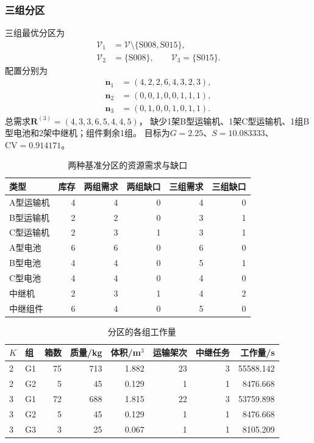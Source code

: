 \subsubsection{三组分区}
三组最优分区为
\begin{align}
\mathcal V_1&=\mathcal V\setminus\{\mathrm{S008,S015}\},\\
\mathcal V_2&=\{\mathrm{S008}\},\qquad \mathcal V_3=\{\mathrm{S015}\}.
\end{align}
配置分别为
\begin{align}
\boldsymbol n_1&=(4,2,2,6,4,3,2,3),\\
\boldsymbol n_2&=(0,0,1,0,0,1,1,1),\\
\boldsymbol n_3&=(0,1,0,0,1,0,1,1).
\end{align}
总需求$\boldsymbol R^{(3)}=(4,3,3,6,5,4,4,5)$，
缺少1架B型运输机、1架C型运输机、1组B型电池和2架中继机；组件剩余1组。
目标为$G=2.25$、$S=10.083333$、$\mathrm{CV}=0.914171$。
\begin{table}[htbp]
\centering
\small
\caption{两种基准分区的资源需求与缺口}
\label{tab:q4_resources}
\begin{tabular}{lrrrrr}
\toprule
类型 & 库存 & 两组需求 & 两组缺口 & 三组需求 & 三组缺口 \\
\midrule
A型运输机 & 4 & 4 & 0 & 4 & 0 \\
B型运输机 & 2 & 2 & 0 & 3 & 1 \\
C型运输机 & 2 & 3 & 1 & 3 & 1 \\
A型电池 & 6 & 6 & 0 & 6 & 0 \\
B型电池 & 4 & 4 & 0 & 5 & 1 \\
C型电池 & 4 & 4 & 0 & 4 & 0 \\
中继机 & 2 & 3 & 1 & 4 & 2 \\
中继组件 & 6 & 4 & 0 & 5 & 0 \\
\bottomrule
\end{tabular}
\end{table}
\begin{table}[htbp]
\centering
\small
\caption{分区的各组工作量}
\label{tab:q4_workload}
\begin{tabular}{llrrrrrr}
\toprule
$K$ & 组 & 箱数 & 质量/kg & 体积/m$^3$ & 运输架次 & 中继任务 & 工作量/s \\
\midrule
2 & G1 & 75 & 713 & 1.882 & 23 & 3 & 55588.142 \\
2 & G2 & 5 & 45 & 0.129 & 1 & 1 & 8476.668 \\
3 & G1 & 72 & 688 & 1.815 & 22 & 3 & 53759.898 \\
3 & G2 & 5 & 45 & 0.129 & 1 & 1 & 8476.668 \\
3 & G3 & 3 & 25 & 0.067 & 1 & 1 & 8105.209 \\
\bottomrule
\end{tabular}
\end{table}

